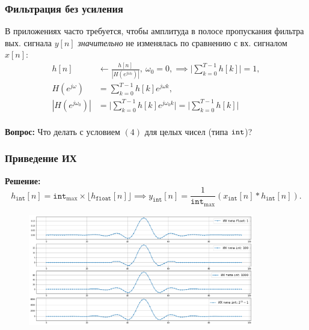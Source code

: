 \documentclass{beamer}
\begin{document}
    \begin{frame}[fragile]
        \frametitle{Фильтрация без усиления}
        \justifying
        В приложениях часто требуется, чтобы амплитуда в полосе пропускания фильтра вых. сигнала $y[n]$ {\it значительно} не изменялась по сравнению с вх. сигналом $x[n]$:
        \begin{equation}
        \begin{split}
            h[n] &\leftarrow \frac{h[n]}{|H(e^{j\omega_{0}})|},\ \omega_{0} = 0, \implies \Biggl\lvert \sum_{k=0}^{T-1} h[k] \Biggr\lvert = 1, \\
            H(e^{j\omega}) &= \sum_{k=0}^{T-1} h[k]e^{j\omega k},\\
            |H(e^{j\omega_{0}})| &= \Biggl\lvert \sum_{k=0}^{T-1} h[k]e^{j\omega_{0} k} \Biggr\lvert = \Biggl\lvert \sum_{k=0}^{T-1} h[k] \Biggr\lvert \\
        \end{split}
        \end{equation}
        \par
        {\bf Вопрос:} Что делать с условием $(4)$ для целых чисел (типа ${\tt int}$)? 
    \end{frame}
    \begin{frame}
        \frametitle{Приведение ИХ}
        {\bf Решение:} $$h_{\texttt{int}}[n] = \texttt{int}_{\textrm{max}} \times \lfloor h_{\texttt{float}}[n] \rfloor \implies y_{\texttt{int}}[n] = \frac{1}{\texttt{int}_{\textrm{max}}}(x_{\texttt{int}}[n] * h_{\texttt{int}}[n]).$$
        \begin{figure}[!tbp]
           \centering
           \includegraphics[width=0.88\textwidth]{pics/IR.png}
           \captionsetup{justification=centering}
       \end{figure}
    \end{frame}
\end{document}
